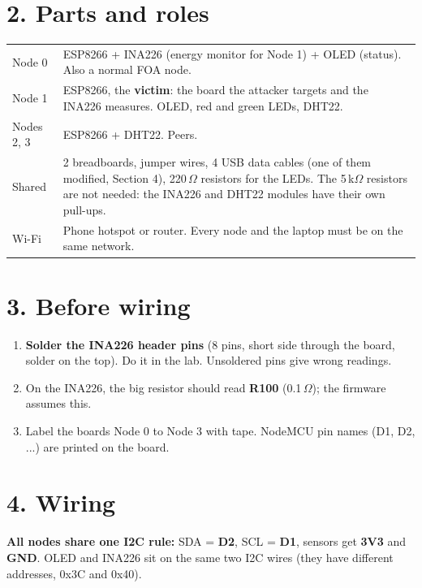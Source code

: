 \documentclass[10pt,a4paper]{article}
\begin{document}
\section*{2. Parts and roles}
\begin{tabularx}{\linewidth}{@{}lX@{}}
\toprule
Node 0 & ESP8266 + INA226 (energy monitor for Node 1) + OLED (status). Also a normal FOA node.\\
Node 1 & ESP8266, the \textbf{victim}: the board the attacker targets and the INA226 measures. OLED, red and green LEDs, DHT22.\\
Nodes 2, 3 & ESP8266 + DHT22. Peers.\\
Shared & 2 breadboards, jumper wires, 4 USB data cables (one of them modified, Section 4), 220\,$\Omega$ resistors for the LEDs. The 5\,k$\Omega$ resistors are not needed: the INA226 and DHT22 modules have their own pull-ups.\\
Wi-Fi & Phone hotspot or router. Every node and the laptop must be on the same network.\\
\bottomrule
\end{tabularx}

\section*{3. Before wiring}
\begin{enumerate}
\item \textbf{Solder the INA226 header pins} (8 pins, short side through the board, solder on the top).
  Do it in the lab. Unsoldered pins give wrong readings.
\item On the INA226, the big resistor should read \textbf{R100} (0.1\,$\Omega$); the firmware assumes this.
\item Label the boards Node 0 to Node 3 with tape. NodeMCU pin names (D1, D2, ...) are printed on the board.
\end{enumerate}

\section*{4. Wiring}
\textbf{All nodes share one I2C rule:} SDA = \textbf{D2}, SCL = \textbf{D1}, sensors get \textbf{3V3} and \textbf{GND}.
OLED and INA226 sit on the same two I2C wires (they have different addresses, 0x3C and 0x40).
\end{document}
